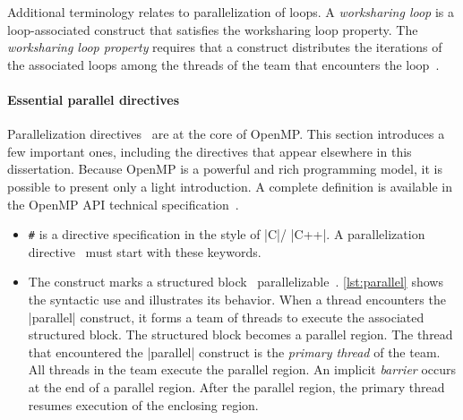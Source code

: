 Additional terminology relates to parallelization of loops.
A \emph{worksharing loop} is a loop-associated construct that satisfies
the worksharing loop property.
The \emph{worksharing loop property} requires that a construct
distributes the iterations of the associated loops among the threads of the team that encounters the loop~\cite[p. 113]{openmp_api}.

\paragraph*{Essential parallel directives}
{Parallelization directives}~ are at the core of OpenMP.
This section introduces a few important ones, including the directives that appear elsewhere in this dissertation.
Because OpenMP is a powerful and rich programming model, it is possible to present only a light introduction.
A complete definition is available in the OpenMP API technical specification~\cite{openmp_api}.

\begin{itemize}

\item \texttt{\#}
is a directive specification in the style of
\pr|C|/%
\pr|C++|.
A {parallelization directive}~ must start with these keywords.

\item The  construct
marks a {structured block}~ parallelizable~\cite[p. 384--385]{openmp_api}.
\autoref{lst:parallel} shows the syntactic use and illustrates its behavior.
When a thread encounters the \pr|parallel| construct,
it forms a {team of threads} to execute the associated {structured block}.
The structured block becomes a {parallel region}.
The thread that encountered the \pr|parallel| construct is the \emph{primary thread} of the team.
All threads in the team execute the {parallel region}.
An implicit \emph{barrier} occurs at the end of a {parallel region}.
After the parallel region, the {primary thread} resumes execution of the enclosing region.

\end{itemize}

